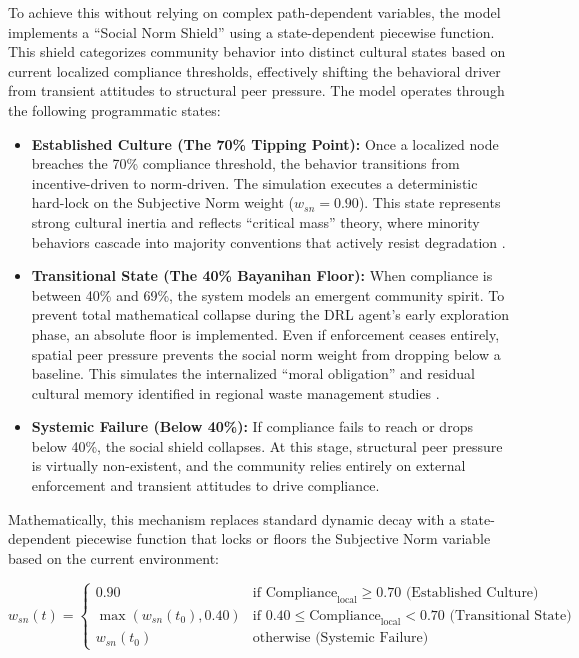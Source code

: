 To achieve this without relying on complex path-dependent variables, the model implements a ``Social Norm Shield'' using a state-dependent piecewise function. This shield categorizes community behavior into distinct cultural states based on current localized compliance thresholds, effectively shifting the behavioral driver from transient attitudes to structural peer pressure.  The model operates through the following programmatic states:

\begin{itemize}
    \item \textbf{Established Culture (The 70\% Tipping Point):} Once a localized node breaches the 70\% compliance threshold, the behavior transitions from incentive-driven to norm-driven. The simulation executes a deterministic hard-lock on the Subjective Norm weight ($w_{sn} = 0.90$). This state represents strong cultural inertia and reflects ``critical mass'' theory, where minority behaviors cascade into majority conventions that actively resist degradation \citep{Centola2018, Nyborg2024}.
    \item \textbf{Transitional State (The 40\% Bayanihan Floor):} When compliance is between 40\% and 69\%, the system models an emergent community spirit. To prevent total mathematical collapse during the DRL agent's early exploration phase, an absolute floor is implemented. Even if enforcement ceases entirely, spatial peer pressure prevents the social norm weight from dropping below a baseline. This simulates the internalized ``moral obligation'' and residual cultural memory identified in regional waste management studies \citep{Nishimura2022}.
    \item \textbf{Systemic Failure (Below 40\%):} If compliance fails to reach or drops below 40\%, the social shield collapses. At this stage, structural peer pressure is virtually non-existent, and the community relies entirely on external enforcement and transient attitudes to drive compliance.
\end{itemize}

Mathematically, this mechanism replaces standard dynamic decay with a state-dependent piecewise function that locks or floors the Subjective Norm variable based on the current environment:

\begin{equation}
    w_{sn}(t) = 
    \begin{cases} 
        0.90 & \text{if } \text{Compliance}_{\mathrm{local}} \ge 0.70 \text{ (Established Culture)} \\
        \max(w_{sn}(t_0), 0.40) & \text{if } 0.40 \le \text{Compliance}_{\mathrm{local}} < 0.70 \text{ (Transitional State)} \\
        w_{sn}(t_0) & \text{otherwise (Systemic Failure)}
    \end{cases}
\end{equation}

